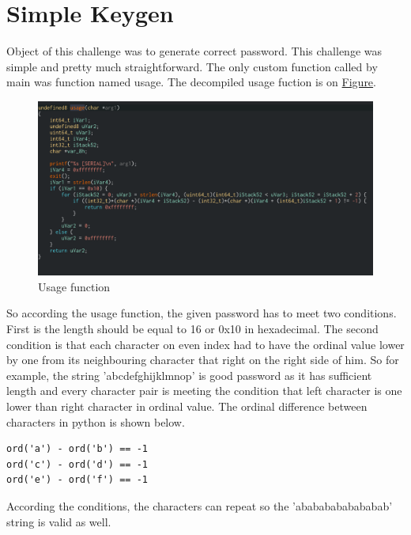 \documentclass[11pt]{article}
\begin{document}
\section{Simple Keygen}
\label{sec:org17752d0}
Object of this challenge was to generate correct password. This challenge was simple and pretty much straightforward.
The only custom function called by main was function named usage. The decompiled usage fuction is on \hyperref[fig-simple-usage]{Figure}.
\begin{figure}[htbp]
\centering
\includegraphics[width=.9\linewidth]{simple_keygen.png}
\caption{\label{fig-simple-usage}Usage function}
\end{figure}

So according the usage function, the given password has to meet two conditions. First is the length should be equal to 16 or 0x10 in hexadecimal.
The second condition is that each character on even index had to have the ordinal value lower by one from its neighbouring character that right on the right side of him.
So for example, the string 'abcdefghijklmnop' is good password as it has sufficient length and every character pair is meeting the condition that left character is one lower than right character in ordinal value.
The ordinal difference between characters in python is shown below.
\begin{verbatim}
ord('a') - ord('b') == -1
ord('c') - ord('d') == -1
ord('e') - ord('f') == -1
\end{verbatim}
According the conditions, the characters can repeat so the 'abababababababab' string is valid as well.
\end{document}
